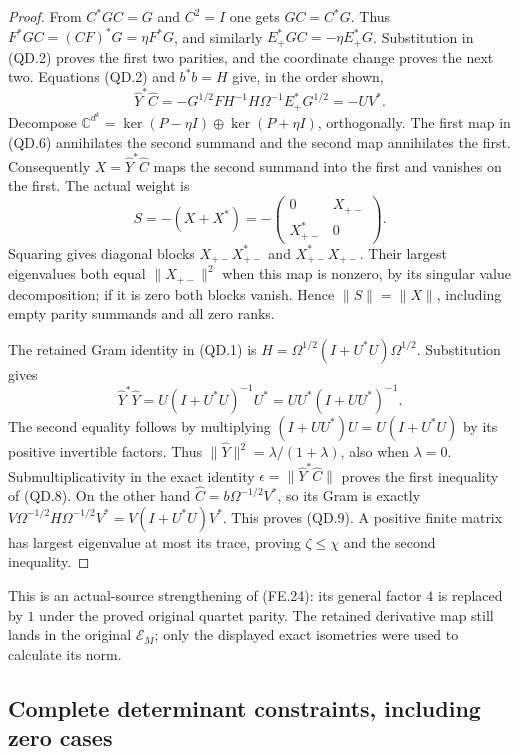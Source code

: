 \begin{proof}
From \(C^*GC=G\) and \(C^2=I\) one gets \(GC=C^*G\).
Thus \(F^*GC=(CF)^*G=\eta F^*G\), and similarly
\(E_+^*GC=-\eta E_+^*G\).  Substitution in (QD.2) proves
the first two parities, and the coordinate change proves the next
two.  Equations (QD.2) and \(b^*b=H\) give, in the order shown,
\[
 \widehat Y^*\widehat C
 =-G^{1/2}FH^{-1}H\Omega^{-1}E_+^*G^{1/2}=-UV^*.
\]
Decompose \(\mathbb C^{d^k}=\ker(P-\eta I)\oplus
\ker(P+\eta I)\), orthogonally.  The first map in (QD.6)
annihilates the second summand and the second map annihilates
the first.  Consequently \(X=\widehat Y^*\widehat C\)
maps the second summand into the first and vanishes on the first.
The actual weight is
\[
 S=-(X+X^*)=
 -\begin{pmatrix}0&X_{+-}\\X_{+-}^*&0\end{pmatrix}.
\]
Squaring gives diagonal blocks \(X_{+-}X_{+-}^*\) and
\(X_{+-}^*X_{+-}\).  Their largest eigenvalues both equal
\(\|X_{+-}\|^2\) when this map is nonzero, by its singular
value decomposition; if it is zero both blocks vanish.  Hence
\(\|S\|=\|X\|\), including empty parity summands and all
zero ranks.

The retained Gram identity in (QD.1) is
\(H=\Omega^{1/2}(I+U^*U)\Omega^{1/2}\).  Substitution gives
\[
 \widehat Y^*\widehat Y
   =U(I+U^*U)^{-1}U^*
   =UU^*(I+UU^*)^{-1}.
\]
The second equality follows by multiplying
\((I+UU^*)U=U(I+U^*U)\) by its positive invertible factors.
Thus \(\|\widehat Y\|^2=\lambda/(1+\lambda)\), also
when \(\lambda=0\).  Submultiplicativity in the exact
identity \(\epsilon=\|\widehat Y^*\widehat C\|\)
proves the first inequality of (QD.8).  On the other hand
\(\widehat C=b\Omega^{-1/2}V^*\), so its Gram is exactly
\(V\Omega^{-1/2}H\Omega^{-1/2}V^*=V(I+U^*U)V^*\).
This proves (QD.9).  A positive finite matrix has largest
eigenvalue at most its trace, proving \(\zeta\leq\chi\)
and the second inequality.
\end{proof}

This is an actual-source strengthening of (FE.24): its general
factor \(4\) is replaced by \(1\) under the proved original
quartet parity.  The retained derivative map still lands in the
original \(\mathcal E_M\); only the displayed exact isometries
were used to calculate its norm.

\subsection{Complete determinant constraints, including zero cases}

